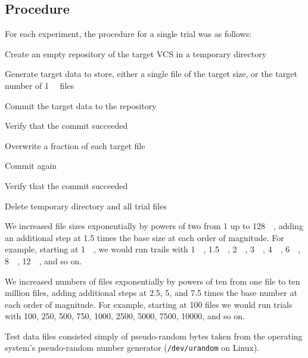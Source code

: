 \subsection{Procedure}

For each experiment, the procedure for a single trial was as follows:

\begin{tight_enumerate}

    \item Create an empty repository of the target VCS in a temporary directory

    \item Generate target data to store, either a single file of the target
        size, or the target number of \SI{1}{\kibi\byte} files

    \item Commit the target data to the repository

    \item Verify that the commit succeeded

    \item Overwrite a fraction of each target file

    \item Commit again

    \item Verify that the commit succeeded

    \item Delete temporary directory and all trial files

\end{tight_enumerate}

We increased file sizes exponentially by powers of two from \SI{1}{\byte} up to
\SI{128}{\gibi\byte}, adding an additional step at \num{1.5} times the base size
at each order of magnitude. For example, starting at \SI{1}{\mebi\byte}, we
would run trails with \SI{1}{\mebi\byte}, \SI{1.5}{\mebi\byte},
\SI{2}{\mebi\byte}, \SI{3}{\mebi\byte}, \SI{4}{\mebi\byte}, \SI{6}{\mebi\byte},
\SI{8}{\mebi\byte}, \SI{12}{\mebi\byte}, and so on.

We increased numbers of files exponentially by powers of ten from one file to
ten million files, adding additional steps at \num{2.5}, \num{5}, and \num{7.5}
times the base number at each order of magnitude. For example, starting at
\num{100} files we would run trials with \num{100}, \num{250}, \num{500},
\num{750}, \num{1000}, \num{2500}, \num{5000}, \num{7500}, \num{10000}, and so
on.

Test data files consisted simply of pseudo-random bytes taken from the operating
system's pseudo-random number generator (\lstinline{/dev/urandom} on Linux).


